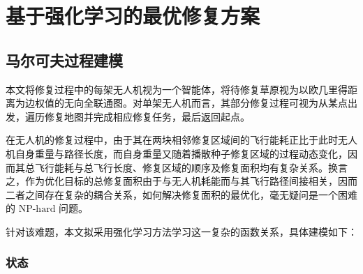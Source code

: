 \documentclass[AutoFakeBold]{LZUThesis}
\begin{document}

\chapter{基于强化学习的最优修复方案}

\section{马尔可夫过程建模}
本文将修复过程中的每架无人机视为一个智能体，将待修复草原视为以欧几里得距离为边权值的无向全联通图。对单架无人机而言，其部分修复过程可视为从某点出发，遍历修复地图并完成相应修复任务，最后返回起点。

在无人机的修复过程中，由于其在两块相邻修复区域间的飞行能耗正比于此时无人机自身重量与路径长度，而自身重量又随着播散种子修复区域的过程动态变化，因而其总飞行能耗与总飞行长度、修复区域的顺序及修复面积均有复杂关系。换言之，作为优化目标的总修复面积由于与无人机耗能而与其飞行路径间接相关，因而二者之间存在复杂的耦合关系，如何解决修复面积的最优化，毫无疑问是一个困难的 $\text{NP-hard}$ 问题。

针对该难题，本文拟采用强化学习方法学习这一复杂的函数关系，具体建模如下：

\subsection{状态}
\end{document}
